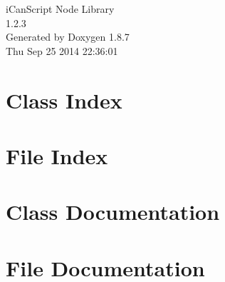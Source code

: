 \documentclass[twoside]{book}
\newcommand{\+}{\discretionary{\mbox{\scriptsize$\hookleftarrow$}}{}{}}
\newcommand{\clearemptydoublepage}{%
  \newpage{\pagestyle{empty}\cleardoublepage}%
}
\begin{document}
\hypersetup{pageanchor=false,
             bookmarks=true,
             bookmarksnumbered=true,
             pdfencoding=unicode
            }
\begin{titlepage}
\vspace*{7cm}
\begin{center}%
{\Large i\+Can\+Script Node Library \\[1ex]\large 1.\+2.\+3 }\\
\vspace*{1cm}
{\large Generated by Doxygen 1.8.7}\\
\vspace*{0.5cm}
{\small Thu Sep 25 2014 22:36:01}\\
\end{center}
\end{titlepage}
\clearemptydoublepage
\tableofcontents
\clearemptydoublepage
{}
\hypersetup{pageanchor=true}

\chapter{Class Index}

\chapter{File Index}

\chapter{Class Documentation}













\chapter{File Documentation}

















\newpage
{}
{}
\printindex
\end{document}
